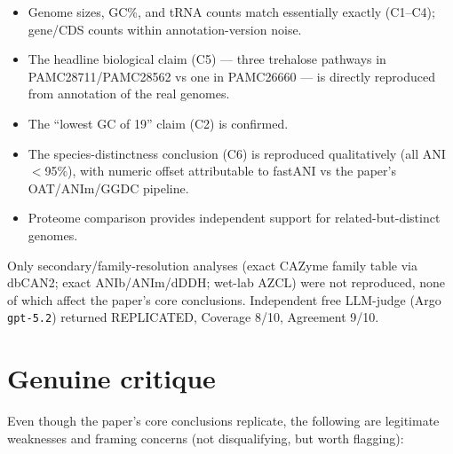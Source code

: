 \documentclass[11pt]{article}
\begin{document}
\begin{itemize}[leftmargin=1.4em]
  \item Genome sizes, GC\%, and tRNA counts match essentially exactly (C1--C4);
        gene/CDS counts within annotation-version noise.
  \item The headline biological claim (C5) --- three trehalose pathways in PAMC28711/PAMC28562
        vs one in PAMC26660 --- is directly reproduced from annotation of the real genomes.
  \item The ``lowest GC of 19'' claim (C2) is confirmed.
  \item The species-distinctness conclusion (C6) is reproduced qualitatively (all ANI $<$95\%),
        with numeric offset attributable to fastANI vs the paper's OAT/ANIm/GGDC pipeline.
  \item Proteome comparison provides independent support for related-but-distinct genomes.
\end{itemize}

Only secondary/family-resolution analyses (exact CAZyme family table via dbCAN2; exact
ANIb/ANIm/dDDH; wet-lab AZCL) were not reproduced, none of which affect the paper's core
conclusions. Independent free LLM-judge (Argo \texttt{gpt-5.2}) returned REPLICATED,
Coverage 8/10, Agreement 9/10.

\section{Genuine critique}

Even though the paper's core conclusions replicate, the following are legitimate weaknesses
and framing concerns (not disqualifying, but worth flagging):
\end{document}
